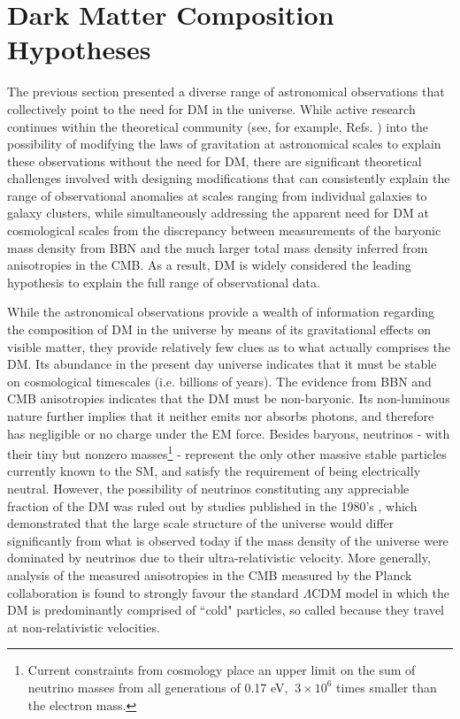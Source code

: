 \section{Dark Matter Composition Hypotheses}

The previous section presented a diverse range of astronomical observations that collectively point to the need for DM in the universe. While active research continues within the theoretical community (see, for example, Refs. \cite{mond_2012, mond_2021}) into the possibility of modifying the laws of gravitation at astronomical scales to explain these observations without the need for DM, there are significant theoretical challenges involved with designing modifications that can consistently explain the range of observational anomalies at scales ranging from individual galaxies to galaxy clusters, while simultaneously addressing the apparent need for DM at cosmological scales from the discrepancy between measurements of the baryonic mass density from BBN and the much larger total mass density inferred from anisotropies in the CMB. As a result, DM is widely considered the leading hypothesis to explain the full range of observational data.

While the astronomical observations provide a wealth of information regarding the composition of DM in the universe by means of its gravitational effects on visible matter, they provide relatively few clues as to what actually comprises the DM. Its abundance in the present day universe indicates that it must be stable on cosmological timescales (i.e. billions of years). The evidence from BBN and CMB anisotropies indicates that the DM must be non-baryonic. Its non-luminous nature further implies that it neither emits nor absorbs photons, and therefore has negligible or no charge under the EM force. Besides baryons, neutrinos - with their tiny but nonzero masses\footnote{Current constraints from cosmology place an upper limit on the sum of neutrino masses from all generations of 0.17 eV, \(~3\times10^6\) times smaller than the electron mass.} - represent the only other massive stable particles currently known to the SM, and satisfy the requirement of being electrically neutral. However, the possibility of neutrinos constituting any appreciable fraction of the DM was ruled out by studies published in the 1980's \cite{neutrino_dm}, which demonstrated that the large scale structure of the universe would differ significantly from what is observed today if the mass density of the universe were dominated by neutrinos due to their ultra-relativistic velocity. More generally, analysis of the measured anisotropies in the CMB measured by the Planck collaboration \cite{Planck_2020} is found to strongly favour the standard \(\Lambda\)CDM model in which the DM is predominantly comprised of ``cold" particles, so called because they travel at non-relativistic velocities.

